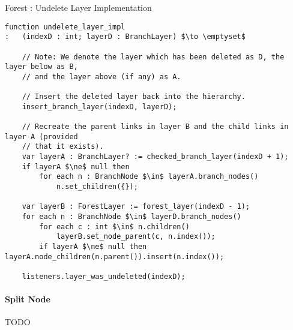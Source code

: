 \begin{stulisting}[p]
\caption{Forest : Undelete Layer Implementation}
\label{code:ipfs-forest-undeletelayerimpl}
\begin{lstlisting}[style=Default]
function undelete_layer_impl
:	(indexD : int; layerD : BranchLayer) $\to \emptyset$

	// Note: We denote the layer which has been deleted as D, the layer below as B,
	// and the layer above (if any) as A.

	// Insert the deleted layer back into the hierarchy.
	insert_branch_layer(indexD, layerD);

	// Recreate the parent links in layer B and the child links in layer A (provided
	// that it exists).
	var layerA : BranchLayer? := checked_branch_layer(indexD + 1);
	if layerA $\ne$ null then
		for each n : BranchNode $\in$ layerA.branch_nodes()
			n.set_children({});

	var layerB : ForestLayer := forest_layer(indexD - 1);
	for each n : BranchNode $\in$ layerD.branch_nodes()
		for each c : int $\in$ n.children()
			layerB.set_node_parent(c, n.index());
		if layerA $\ne$ null then layerA.node_children(n.parent()).insert(n.index());

	listeners.layer_was_undeleted(indexD);
\end{lstlisting}
\end{stulisting}

\paragraph{Split Node}

TODO

